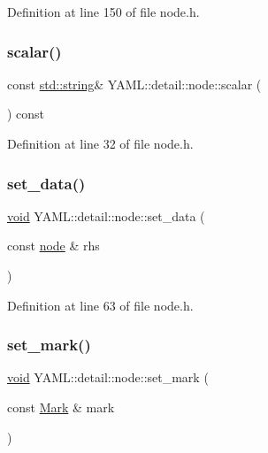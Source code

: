 Definition at line 150 of file node.\+h.

\mbox{\label{class_y_a_m_l_1_1detail_1_1node_a668af98822f9340b7bc97bb5fa0fbe97}} 
\subsubsection{\texorpdfstring{scalar()}{scalar()}}
{\footnotesize\ttfamily const \mbox{\hyperlink{glad_8h_ac83513893df92266f79a515488701770}{std\+::string}}\& Y\+A\+M\+L\+::detail\+::node\+::scalar (\begin{DoxyParamCaption}{ }\end{DoxyParamCaption}) const\hspace{0.3cm}{\ttfamily [inline]}}



Definition at line 32 of file node.\+h.

\mbox{\label{class_y_a_m_l_1_1detail_1_1node_a4689eaba86e9190e8e7313a73ca42c1c}} 
\subsubsection{\texorpdfstring{set\_data()}{set\_data()}}
{\footnotesize\ttfamily \mbox{\hyperlink{glad_8h_a950fc91edb4504f62f1c577bf4727c29}{void}} Y\+A\+M\+L\+::detail\+::node\+::set\+\_\+data (\begin{DoxyParamCaption}\item[{const \mbox{\hyperlink{class_y_a_m_l_1_1detail_1_1node}{node}} \&}]{rhs }\end{DoxyParamCaption})\hspace{0.3cm}{\ttfamily [inline]}}



Definition at line 63 of file node.\+h.

\mbox{\label{class_y_a_m_l_1_1detail_1_1node_aeba01fd4c8c0ccde7a21926c716ee333}} 
\subsubsection{\texorpdfstring{set\_mark()}{set\_mark()}}
{\footnotesize\ttfamily \mbox{\hyperlink{glad_8h_a950fc91edb4504f62f1c577bf4727c29}{void}} Y\+A\+M\+L\+::detail\+::node\+::set\+\_\+mark (\begin{DoxyParamCaption}\item[{const \mbox{\hyperlink{struct_y_a_m_l_1_1_mark}{Mark}} \&}]{mark }\end{DoxyParamCaption})\hspace{0.3cm}{\ttfamily [inline]}}



